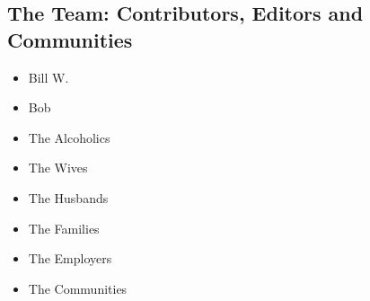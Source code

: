 
\subsection*{The Team: Contributors, Editors and Communities}

\begin{multicols}{3}
\begin{headings}
\vspace{-\topsep}
\begin{itemize}[rightmargin=0.125in, leftmargin=0.125in]
\fontsize{9.5pt}{11pt}\selectfont
\setlength{\parskip}{0pt} \setlength{\itemsep}{0pt plus 1pt}
\setlength{\columnsep}{0}
    

\item Bill W.
\item Bob
\item The Alcoholics
\item The Wives
\item The Husbands
\item The Families
\item The Employers
\item The Communities
\vfill
\end{itemize}

\vspace{-\topsep}
\end{headings}
\end{multicols}

